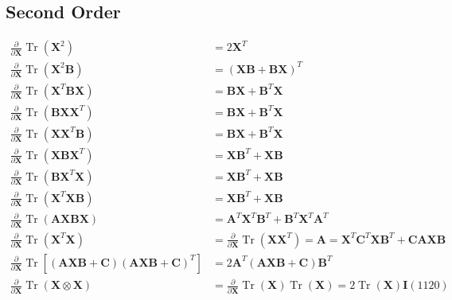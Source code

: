 \subsection{Second Order}


\begin{equation}
\begin{aligned}
\frac{\partial}{\partial \mathbf{X}} \operatorname{Tr}\left(\mathbf{X}^{2}\right) &=2 \mathbf{X}^{T} \\
\frac{\partial}{\partial \mathbf{X}} \operatorname{Tr}\left(\mathbf{X}^{2} \mathbf{B}\right) &=(\mathbf{X B}+\mathbf{B X})^{T} \\
\frac{\partial}{\partial \mathbf{X}} \operatorname{Tr}\left(\mathbf{X}^{T} \mathbf{B} \mathbf{X}\right) &=\mathbf{B X}+\mathbf{B}^{T} \mathbf{X} \\
\frac{\partial}{\partial \mathbf{X}} \operatorname{Tr}\left(\mathbf{B X X}^{T}\right) &=\mathbf{B X}+\mathbf{B}^{T} \mathbf{X} \\
\frac{\partial}{\partial \mathbf{X}} \operatorname{Tr}\left(\mathbf{X} \mathbf{X}^{T} \mathbf{B}\right) &=\mathbf{B X}+\mathbf{B}^{T} \mathbf{X} \\
\frac{\partial}{\partial \mathbf{X}} \operatorname{Tr}\left(\mathbf{X B X}^{T}\right) &=\mathbf{X B}^{T}+\mathbf{X B} \\
\frac{\partial}{\partial \mathbf{X}} \operatorname{Tr}\left(\mathbf{B X}^{T} \mathbf{X}\right) &=\mathbf{X B}^{T}+\mathbf{X B} \\
\frac{\partial}{\partial \mathbf{X}} \operatorname{Tr}\left(\mathbf{X}^{T} \mathbf{X B}\right) &=\mathbf{X B}^{T}+\mathbf{X B} \\
\frac{\partial}{\partial \mathbf{X}} \operatorname{Tr}(\mathbf{A X B X}) &=\mathbf{A}^{T} \mathbf{X}^{T} \mathbf{B}^{T}+\mathbf{B}^{T} \mathbf{X}^{T} \mathbf{A}^{T} \\
\frac{\partial}{\partial \mathbf{X}} \operatorname{Tr}\left(\mathbf{X}^{T} \mathbf{X}\right) &=\frac{\partial}{\partial \mathbf{X}} \operatorname{Tr}\left(\mathbf{X X}^{T}\right)=\mathbf{A}=\mathbf{X}^{T} \mathbf{C}^{T} \mathbf{X B}^{T}+\mathbf{C A X B} \\
\frac{\partial}{\partial \mathbf{X}} \operatorname{Tr}\left[(\mathbf{A X B}+\mathbf{C})(\mathbf{A X B}+\mathbf{C})^{T}\right] &=2 \mathbf{A}^{T}(\mathbf{A X B}+\mathbf{C}) \mathbf{B}^{T} \\
\frac{\partial}{\partial \mathbf{X}} \operatorname{Tr}(\mathbf{X} \otimes \mathbf{X}) &=\frac{\partial}{\partial \mathbf{X}} \operatorname{Tr}(\mathbf{X}) \operatorname{Tr}(\mathbf{X})=2 \operatorname{Tr}(\mathbf{X}) \mathbf{I}(1120)
\end{aligned}
\end{equation}

